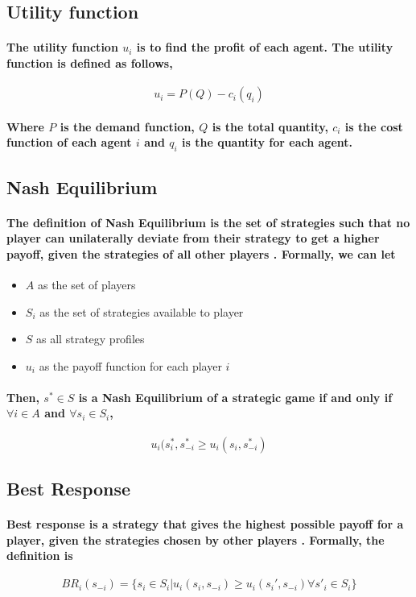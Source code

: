 \documentclass[11pt]{report}
\begin{document}
\subsection{Utility function}
\paragraph{The utility function $u_i$ is to find the profit of each agent. The utility function is defined as follows, }
\[u_i = P(Q)-c_i(q_i)\]
\paragraph{Where $P$ is the demand function, $Q$ is the total quantity, $c_i$ is the cost function of each agent $i$ and $q_i$ is the quantity for each agent. }

\subsection{Nash Equilibrium} 
\paragraph{The definition of Nash Equilibrium is the set of strategies such that no player can unilaterally deviate from their strategy to get a higher payoff, given the strategies of all other players \cite{nash1950equilibrium}. Formally, we can let}

\begin{itemize}
	\item $A$ as the set of players
	\item $S_i$ as the set of strategies available to player
	\item $S$ as all strategy profiles
	\item $u_i$ as the payoff function for each player $i$
\end{itemize}

\paragraph{Then, $s^*\in S$ is a Nash Equilibrium of a strategic game if and only if $\forall i \in A$ and $\forall s_i \in S_i$, }
\[u_i(s_i^*, s_{-i}^* \geq u_i(s_i, s_{-i}^*)\]


\subsection{Best Response }
\paragraph{Best response is a strategy that gives the highest possible payoff for a player, given the strategies chosen by other players \cite{nash1951noncooperative}. Formally, the definition is }
\[BR_i(s_{-i}) = \{s_i \in S_i | u_i(s_i, s_{-i}) \geq u_i(s_i', s_{-i}) \forall s'_{i} \in S_i \}  \]
\end{document}
